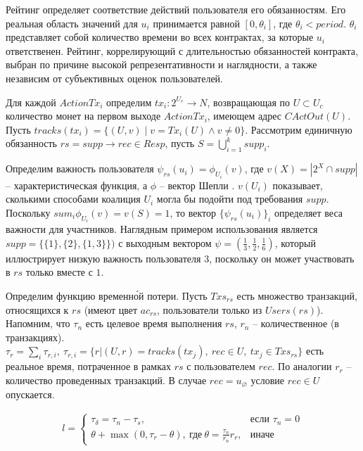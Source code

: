 \documentclass[specification,annotation]{itmo-student-thesis}
\begin{document}
Рейтинг определяет соответствие действий пользователя его
обязанностям. Его реальная область значений для $u_i$ принимается
равной $[0,\theta_i]$, где $\theta_i < period$. $\theta_i$ представляет
собой количество времени во всех контрактах, за которые $u_i$
ответственен. Рейтинг, коррелирующий с длительностью обязанностей
контракта, выбран по причине высокой репрезентативности и наглядности,
а также независим от субъективных оценок пользователей.

Для каждой $ActionTx_i$ определим $tx_i : 2^{U_c} \rightarrow N$,
возвращающая по $U \subset U_c$ количество монет на первом выходе
$ActionTx_i$, имеющем адрес $CActOut(U)$. Пусть $tracks(tx_i) = \{
(U,v) \mid v = Tx_i(U) \wedge v \neq 0 \}$. Рассмотрим единичную обязанность $rs =
supp \rightarrow rec \in Resp$, пусть $S = \bigcup_{i=1}^{k}{supp_i}$.

Определим важность пользователя $\psi_{rs}(u_i) = \phi_{U_i}(v)$, где
$v(X) = |2^X \cap supp|$ -- характеристическая функция, а $\phi$ --
вектор Шепли \cite{shapley} \cite{petrosyan}. $v(U_i)$ показывает,
сколькими способами коалиция $U_i$ могла бы подойти под требования
$supp$. Поскольку $sum_i{\phi_{U_i}(v)} = v(S) = 1$, то вектор
$\{\psi_{rs}(u_i)\}_i$ определяет веса важности для
участников. Наглядным примером использования является $supp =
\{\{1\},\{2\},\{1,3\}\})$ с выходным вектором $\psi = (\frac{1}{3},
\frac{1}{2}, \frac{1}{6})$, который иллюстрирует низкую важность
пользователя $3$, поскольку он может участвовать в $rs$ только вместе
с $1$.

Определим функцию временн\'{о}й потери. Пусть $Txs_{rs}$ есть
множество транзакций, относящихся к $rs$ (имеют цвет $ac_{rs}$,
пользователи только из $Users(rs)$). Напомним, что $\tau_n$ есть
целевое время выполнения $rs$, $r_n$ -- количественное (в
транзакциях). $\tau_r = \sum_i{\tau_{r,i}},\ \tau_{r,i} = \{r | (U,r)
= tracks(tx_j),\ rec \in U, \ tx_j \in Txs_{rs}\}$ есть реальное время,
  потраченное в рамках $rs$ с пользователем $rec$. По аналогии $r_r$
  -- количество проведенных транзакций. В случае $rec =
  u_{\varnothing}$ условие $rec \in U$ опускается.

\begin{align*}
l =
\begin{cases}
  \tau_{\delta} = \tau_n - \tau_s, & \text{если } \tau_n = 0 \\
  \theta + \max{(0, \tau_r - \theta)}, \ \text{где} \ \theta = \frac{\tau_n}{r_n}r_r, & \text{иначе}
\end{cases}
\end{align*}
\end{document}
